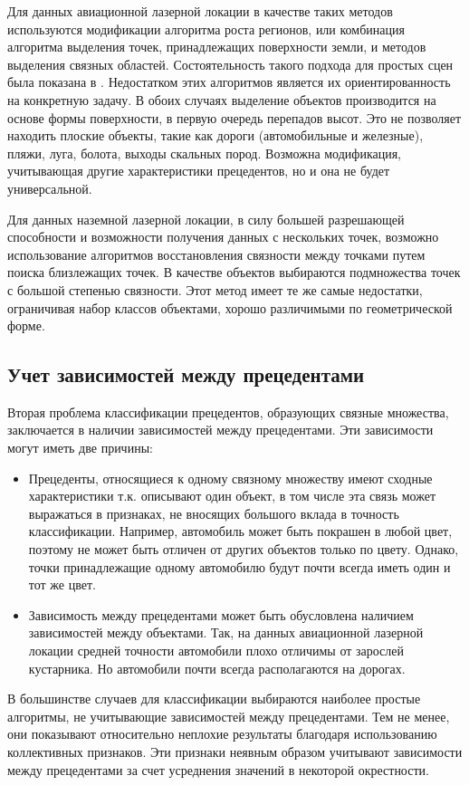 Для данных авиационной лазерной локации в качестве таких методов используются модификации алгоритма роста регионов\cite{Brenner, growing}, или комбинация алгоритма выделения точек, принадлежащих поверхности земли\cite{filer comparison}, и методов выделения связных областей. Состоятельность такого подхода для простых сцен была показана в \cite{whole objects}. Недостатком этих алгоритмов является их ориентированность на конкретную задачу. В обоих случаях выделение объектов производится на основе формы поверхности, в первую очередь перепадов высот. Это не позволяет находить плоские объекты, такие как дороги (автомобильные и железные), пляжи, луга, болота, выходы скальных пород. Возможна модификация, учитывающая другие характеристики прецедентов, но и она не будет универсальной.

Для данных наземной лазерной локации, в силу большей разрешающей способности и возможности получения данных с нескольких точек, возможно использование алгоритмов восстановления связности между точками путем поиска близлежащих точек. В качестве объектов выбираются подмножества точек с большой степенью связности\cite{MMM}. Этот метод имеет те же самые недостатки, ограничивая набор классов объектами, хорошо различимыми по геометрической форме.

\subsection{Учет зависимостей между прецедентами}

Вторая проблема классификации прецедентов, образующих связные множества, заключается в наличии зависимостей между прецедентами. Эти зависимости могут иметь две причины: 
\begin{itemize}
 \item Прецеденты, относящиеся к одному связному множеству имеют сходные характеристики т.к. описывают один объект, в том числе эта связь может выражаться в признаках, не вносящих большого вклада в точность классификации. Например, автомобиль может быть покрашен в любой цвет, поэтому не может быть отличен от других объектов только по цвету. Однако, точки принадлежащие одному автомобилю будут почти всегда иметь один и тот же цвет.
 \item Зависимость между прецедентами может быть обусловлена наличием зависимостей между объектами. Так, на данных авиационной лазерной локации средней точности автомобили плохо отличимы от зарослей кустарника. Но автомобили почти всегда располагаются на дорогах. 
\end{itemize}
В большинстве случаев для классификации выбираются наиболее простые алгоритмы, не учитывающие зависимостей между прецедентами. Тем не менее, они показывают относительно неплохие результаты благодаря использованию коллективных признаков. Эти признаки неявным образом учитывают зависимости между прецедентами за счет усреднения значений в некоторой окрестности.

